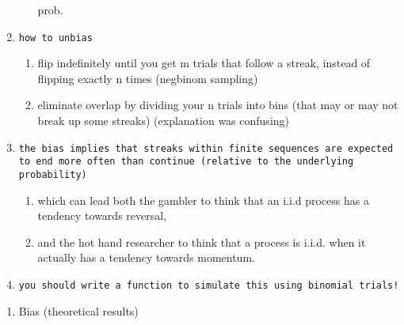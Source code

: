 \documentclass[12pt,twoside]{dukestatscithesis}
\providecommand{\tightlist}{%
  \setlength{\itemsep}{0pt}\setlength{\parskip}{0pt}}
\theoremstyle{definition}
\theoremstyle{definition}
\theoremstyle{definition}
\theoremstyle{remark}
\begin{document}
\begin{enumerate}
\begin{enumerate}
    prob.
  \end{enumerate}
\item
\begin{verbatim}
how to unbias
\end{verbatim}
  \begin{enumerate}
  \def\labelenumii{\alph{enumii}.}
  \tightlist
  \item
    flip indefinitely until you get m trials that follow a streak,
    instead of flipping exactly n times (negbinom sampling)
  \item
    eliminate overlap by dividing your n trials into bins (that may or
    may not break up some streaks) (explanation was confusing)
  \end{enumerate}
\item
\begin{verbatim}
the bias implies that streaks within finite sequences are expected to end more often than continue (relative to the underlying probability)
\end{verbatim}
  \begin{enumerate}
  \def\labelenumii{\alph{enumii}.}
  \tightlist
  \item
    which can lead both the gambler to think that an i.i.d process has a
    tendency towards reversal,
  \item
    and the hot hand researcher to think that a process is i.i.d. when
    it actually has a tendency towards momentum.
  \end{enumerate}
\item
\begin{verbatim}
you should write a function to simulate this using binomial trials!
\end{verbatim}
\end{enumerate}
\begin{enumerate}
\def\labelenumi{\Alph{enumi}.}
\setcounter{enumi}{1}
\tightlist
\item
  Bias (theoretical results)
\end{enumerate}
\end{document}
